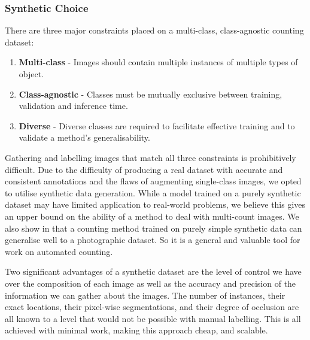 \documentclass[../thesis.tex]{subfiles}
\begin{document}
\subsubsection{Synthetic Choice}
There are three major constraints placed on a multi-class, class-agnostic counting dataset:
\begin{enumerate}
    \item \textbf{Multi-class} - Images should contain multiple instances of multiple types of object. 
    \item \textbf{Class-agnostic} - Classes must be mutually exclusive between training, validation and inference time. 
    \item \textbf{Diverse} - Diverse classes are required to facilitate effective training and to validate a method's generalisability.
\end{enumerate}


Gathering and labelling images that match all three constraints is prohibitively difficult. 
Due to the difficulty of producing a real dataset with accurate and consistent annotations and the flaws of augmenting single-class images, we opted to utilise synthetic data generation. While a model trained on a purely synthetic dataset may have limited application to real-world problems, we believe this gives an upper bound on the ability of a method to deal with multi-count images.
We also show in  that a counting method trained on purely simple synthetic data can generalise well to a photographic dataset.
So it is a general and valuable tool for work on automated counting.

Two significant advantages of a synthetic dataset are the level of control we have over the composition of each image as well as the accuracy and precision of the information we can gather about the images.
The number of instances, their exact locations, their pixel-wise segmentations, and their degree of occlusion are all known to a level that would not be possible with manual labelling.
This is all achieved with minimal work, making this approach cheap, and scalable.
\end{document}
